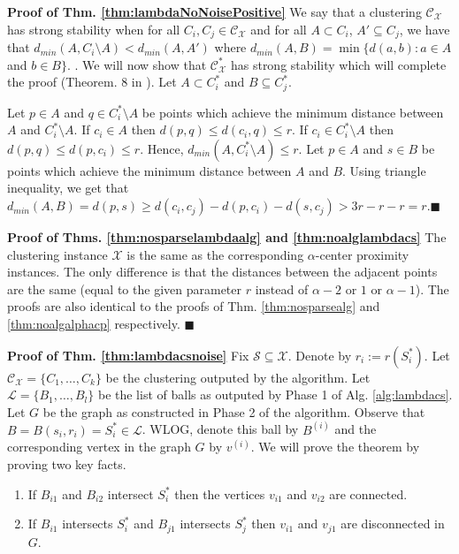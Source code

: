 \documentclass[orivec]{llncs}
\newcommand{\mc}{\mathcal}
\renewcommand{\qed}{\hfill\ensuremath{\blacksquare}}
\renewcommand\labelitemi{$\bullet$}
\begin{document}
\noindent\textbf{Proof of Thm. \ref{thm:lambdaNoNoisePositive}}
We say that a clustering $\mc C_{\mc X}$ has strong stability \cite{balcan2008discriminative} when for all $C_i, C_j \in \mc C_{\mc X}$ and for all $A \subset C_i$, $A' \subseteq C_j$, we have that $d_{min}(A, C_i\setminus A) < d_{min}(A, A')$ where $d_{min}(A, B) = \min \{d(a, b): a \in A$ and $b \in B\}$.  .  We will now show that $\mc C_{\mc X}^*$ has strong stability which will complete the proof (Theorem. 8 in \cite{balcan2008discriminative}). Let $A \subset C_i^*$ and $B \subseteq C_j^*$. 

Let $p \in A$ and $q \in C_i^* \setminus A$ be points which achieve the minimum distance between $A$ and $C_i^*\setminus A$. If $c_i \in A$ then $d(p, q) \le d(c_i, q) \le r$. If $c_i \in C_i^* \setminus A$ then $d(p, q) \le d(p, c_i) \le r$. Hence, $d_{min} (A, C_i^*\setminus A) \le r$. Let $p \in A$ and $s \in B$ be points which achieve the minimum distance between $A$ and $B$. Using triangle inequality, we get that $d_{min}(A, B) = d(p, s) \ge d(c_i, c_j) - d(p, c_i) - d(s, c_j) > 3r - r - r = r$.\qed

\noindent\textbf{Proof of Thms. \ref{thm:nosparselambdaalg} and \ref{thm:noalglambdacs}}
The clustering instance $\mc X$ is the same as the corresponding $\alpha$-center proximity instances. The only difference is that the distances between the adjacent points are the same (equal to the given parameter $r$ instead of $\alpha-2$ or $1$ or $\alpha-1$). The proofs are also identical to the proofs of Thm. \ref{thm:nosparsealg} and \ref{thm:noalgalphacp} respectively. \qed

\noindent\textbf{Proof of Thm. \ref{thm:lambdacsnoise}}
Fix $\mc S \subseteq \mc X$. Denote by $r_i := r(S_i^*)$. Let $\mc C_{\mc X} = \{C_1, \ldots, C_k\}$ be the clustering outputed by the algorithm. Let $\mc L = \{B_1, \ldots, B_l\}$ be the list of balls as outputed by Phase 1 of Alg. \ref{alg:lambdacs}. Let $G$ be the graph as constructed in Phase 2 of the algorithm. Observe that $B = B(s_i, r_i) = S_i^* \in \mc L$. WLOG, denote this ball by $B^{(i)}$ and the corresponding vertex in the graph $G$ by $v^{(i)}$. We will prove the theorem by proving two key facts.  

\begin{enumerate}[nolistsep,noitemsep,label=\textbf{F.\arabic*}]
\renewcommand\labelitemi{$\diamond$}
\item \label{fact:lambda1} If $B_{i1}$ and $B_{i2}$ intersect $S_i^*$ then the vertices $v_{i1}$ and $v_{i2}$ are connected.
\item \label{fact:lambda2} If $B_{i1}$ intersects $S_i^*$ and $B_{j1}$ intersects $S_j^*$ then $v_{i1}$ and $v_{j1}$ are disconnected in $G$.	
\end{enumerate}
\end{document}
